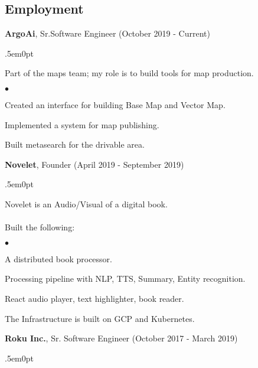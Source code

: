 \documentclass[margin, line, 10pt]{res}
\newenvironment{list2}{
  \begin{list}{$\bullet$}{%
      \setlength{\itemsep}{0in}
      \setlength{\parsep}{0in} \setlength{\parskip}{0in}
      \setlength{\topsep}{0in} \setlength{\partopsep}{0in}
      \setlength{\leftmargin}{0.2in}}}{\end{list}}
\begin{document}
\begin{resume}
\section{Employment}


\vspace{.05cm}

{\Large {\bf ArgoAi}}, Sr.Software Engineer  \hfill (October 2019 - Current)\\
\begin{adjustwidth}{.5em}{0pt}

  \vspace{-.3cm}
  Part of the maps team; my role is to build tools for map production.\\

  \begin{list2}
    \item Created an interface for building Base Map and Vector Map.
    \item Implemented a system for map publishing.
    \item Built metasearch for the drivable area.
  \end{list2}

\end{adjustwidth}

{\Large {\bf Novelet}}, Founder  \hfill (April 2019 - September 2019)\\
\begin{adjustwidth}{.5em}{0pt}

  \vspace{-.3cm}
  Novelet is an Audio/Visual of a digital book.\\ \\
  \vspace{.2cm}
  Built the following:
  \begin{list2}
  \item A distributed book processor.
  \item Processing pipeline with NLP, TTS, Summary, Entity recognition.
  \item React audio player, text highlighter, book reader.
  \item The Infrastructure is built on GCP and Kubernetes.
  \end{list2}
  \vspace{.05cm}
\end{adjustwidth}


{\Large {\bf Roku Inc.}},  Sr. Software Engineer \hfill (October 2017 - March 2019)\\
\begin{adjustwidth}{.5em}{0pt}


\end{adjustwidth}
\end{resume}
\end{document}

